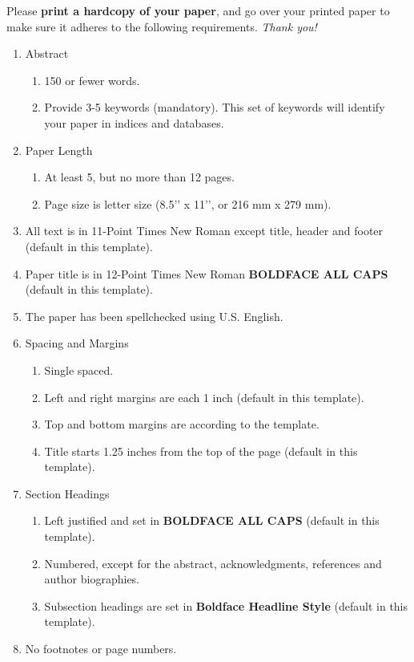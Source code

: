 \documentclass{scspaperproc}
\theoremstyle{scsthe}
\begin{document}
Please \textbf{print a hardcopy of your paper}, and go over your printed paper to make sure it adheres to the following requirements. \textit{Thank you!}

\begin{enumerate}
	\item Abstract
  \begin{enumerate}
	  \item 150 or fewer words.
	  \item Provide 3-5 keywords (mandatory). This set of keywords will identify your paper in indices and databases.
	\end{enumerate}
	\item Paper Length
  \begin{enumerate}
	  \item At least 5, but no more than 12 pages.
	  \item Page size is letter size (8.5’’ x 11’’, or 216 mm x 279 mm).
	\end{enumerate}
	\item All text is in 11-Point Times New Roman except title, header and footer (default in this template).
	\item Paper title is in 12-Point Times New Roman \textbf{BOLDFACE ALL CAPS} (default in this template).
	\item The paper has been spellchecked using U.S. English. 
	\item Spacing and Margins
  \begin{enumerate}
	  \item Single spaced.
	  \item Left and right margins are each 1 inch (default in this template).
	  \item Top and bottom margins are according to the template.
	  \item Title starts 1.25 inches from the top of the page (default in this template).
	\end{enumerate}
	\item Section Headings
  \begin{enumerate}
	  \item Left justified and set in \textbf{BOLDFACE ALL CAPS} (default in this template).
	  \item Numbered, except for the abstract, acknowledgments, references and author biographies.
	  \item Subsection headings are set in \textbf{Boldface Headline Style} (default in this template).
	\end{enumerate}
	\item No footnotes or page numbers.

\end{enumerate}
\end{document}
